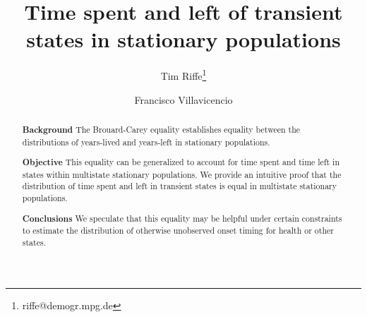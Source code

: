 \documentclass[12pt,oneside,a4paper]{article}
\newcommand{\absdiv}[1]{%
  \par\addvspace{.5\baselineskip}%
  \noindent\textbf{#1}\quad\ignorespaces
}
\theoremstyle{definition}
\begin{document}
\title{Time spent and left of transient states in
stationary populations}

\author[1]{Tim Riffe\thanks{riffe@demogr.mpg.de}}
\author[2]{Francisco Villavicencio}





\maketitle

\vspace{-2em}

              
\maketitle

\begin{abstract}
\absdiv{Background} The Brouard-Carey equality establishes equality
between the distributions of years-lived and years-left in stationary populations. 
\absdiv{Objective} This equality can be generalized to account for time
spent and time left in states within multistate stationary populations. We
provide an intuitive proof that the distribution of time spent and left in
transient states is equal in multistate stationary populations. 
\absdiv{Conclusions} We speculate that this equality may be helpful under
certain constraints to estimate the distribution of otherwise unobserved onset timing for health or other states.
\end{abstract}
\end{document}
